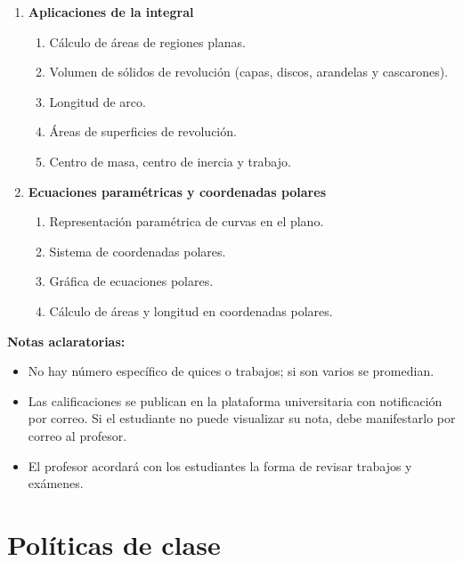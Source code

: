 \begin{enumerate}
\item \textbf{Aplicaciones de la integral}
\begin{enumerate}[$a)$]
\item Cálculo de áreas de regiones planas.
\item Volumen de sólidos de revolución (capas, discos, arandelas y cascarones).
\item Longitud de arco.
\item Áreas de superficies de revolución.
\item Centro de masa, centro de inercia y trabajo.
\end{enumerate}

\item \textbf{Ecuaciones paramétricas y coordenadas polares}
\begin{enumerate}[$a)$]
\item Representación paramétrica de curvas en el plano.
\item Sistema de coordenadas polares.
\item Gráfica de ecuaciones polares.
\item Cálculo de áreas y longitud en coordenadas polares.
\end{enumerate}
\end{enumerate}

\textbf{Notas aclaratorias:}
\begin{itemize}
\item No hay número específico de quices o trabajos; si son varios se promedian.
\item Las calificaciones se publican en la plataforma universitaria con notificación por correo. Si el estudiante no puede visualizar su nota, debe manifestarlo por correo al profesor.
\item El profesor acordará con los estudiantes la forma de revisar trabajos y exámenes.
\end{itemize}

\section{Políticas de clase}

